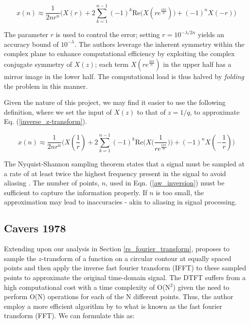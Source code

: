 \documentclass[a4paper]{report}
\begin{document}
\begin{equation}\label{aw_inversion_original}
	x(n) \approx \frac{1}{2nr^n} \biggr( X(r) + 2\sum^{n-1}_{k = 1} (-1)^k \mathrm{Re}\bigg( X(re^{\frac{ik\pi}{n}})\bigg) + (-1)^nX(-r) \biggl)
\end{equation}

The parameter $r$ is used to control the error; setting $r = 10^{-\lambda / 2n}$ yields an accuracy bound of $10^{-\lambda}$. The authors leverage the inherent symmetry within the complex plane to enhance computational efficiency by exploiting the complex conjugate symmetry of $X(z)$; each term $X(re^{\frac{ik\pi}{n}})$ in the upper half has a mirror image in the lower half. The computational load is thus halved by \textit{folding} the problem in this manner.

Given the nature of this project, we may find it easier to use the following definition, where we set the input of $X(z)$ to that of $z = 1 / q$, to approximate Eq. (\ref{inverse_z-transform}).

\begin{equation}\label{aw_inversion}
	x(n) \approx \frac{1}{2nr^n} \biggr( X(\frac{1}{r}) + 2\sum^{n-1}_{k = 1} (-1)^k \text{Re}\bigg( X\big(\frac{1}{re^{\frac{ik\pi}{n}}}\big)\bigg) + (-1)^nX(-\frac{1}{r}) \biggl)
\end{equation}

The Nyquist-Shannon sampling theorem states that a signal must be sampled at a rate of at least twice the highest frequency present in the signal to avoid aliasing \citep{shannon1949communication,nyquist1928certain}. The number of points, $n$, used in Eqn. (\ref{aw_inversion}) must be sufficient to capture the information properly. If $n$ is too small, the approximation may lead to inaccuracies - akin to aliasing in signal processing.

\subsection{Cavers 1978}\label{cavers_section}
Extending upon our analysis in Section \ref{rs_fourier_transform}, \citet{Cavers1978FFT} proposes to sample the $z$-transform of a function on a circular contour at equally spaced points and then apply the inverse fast fourier transform (IFFT) to these sampled points to approximate the original time-domain signal. The DTFT suffers from a high computational cost with a time complexity of O(N$^2$) given the need to perform O(N) operations for each of the N different points. Thus, the author employ a more efficient algorithm by \citet{cooley1965algorithm} to what is known as the fast fourier transform (FFT). We can formulate this as:
\end{document}
